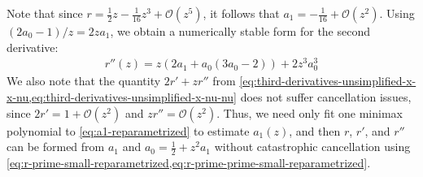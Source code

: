 \documentclass{article}
\begin{document}
%
Note that since $r = \frac{1}{2}z - \frac{1}{16}z^3 + \mathcal{O}(z^5)$, it follows that $a_1 = -\frac{1}{16} + \mathcal{O}(z^2)$.
Using $(2 a_0 - 1) / z = 2 z a_1$, we obtain a numerically stable form for the second derivative:
%
\begin{align}\label{eq:r-prime-prime-small-reparametrized}
  \boxed{r''(z) = z (2a_1 + a_0 (3 a_0 - 2)) + 2 z^3 a_0^3}
\end{align}
%
We also note that the quantity $2r' + z r''$ from \cref{eq:third-derivatives-unsimplified-x-x-nu,eq:third-derivatives-unsimplified-x-nu-nu} does not suffer cancellation issues, since $2r' = 1 + \mathcal{O}(z^2)$ and $z r'' = \mathcal{O}(z^2)$.
Thus, we need only fit one minimax polynomial to \cref{eq:a1-reparametrized} to estimate $a_1(z)$, and then $r$, $r'$, and $r''$ can be formed from $a_1$ and $a_0 = \frac{1}{2} + z^2 a_1$ without catastrophic cancellation using \cref{eq:r-prime-small-reparametrized,eq:r-prime-prime-small-reparametrized}.


\end{document}
